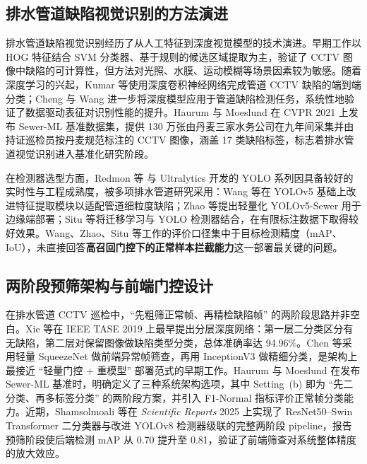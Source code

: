 \documentclass[UTF8,openany,12pt]{ctexbook}
\begin{document}
\subsection{排水管道缺陷视觉识别的方法演进}
排水管道缺陷视觉识别经历了从人工特征到深度视觉模型的技术演进。早期工作以 HOG 特征结合 SVM 分类器、基于规则的候选区域提取为主，验证了 CCTV 图像中缺陷的可计算性，但方法对光照、水膜、运动模糊等场景因素较为敏感\cite{halfawy2014hogsvm}。随着深度学习的兴起，Kumar 等使用深度卷积神经网络完成管道 CCTV 缺陷的端到端分类\cite{kumar2018cnn}；Cheng 与 Wang 进一步将深度模型应用于管道缺陷检测任务，系统性地验证了数据驱动表征对识别性能的提升\cite{cheng2018deep}。Haurum 与 Moeslund 在 CVPR 2021 上发布 Sewer-ML 基准数据集，提供 130 万张由丹麦三家水务公司在九年间采集并由持证巡检员按丹麦规范标注的 CCTV 图像，涵盖 17 类缺陷标签，标志着排水管道视觉识别进入基准化研究阶段\cite{haurum2021sewerml}。

在检测器选型方面，Redmon 等\cite{redmon2016yolo} 与 Ultralytics\cite{jocher2023ultralytics} 开发的 YOLO 系列因具备较好的实时性与工程成熟度，被多项排水管道研究采用：Wang 等在 YOLOv5 基础上改进特征提取模块以适配管道细粒度缺陷\cite{wang2023improvedyolov5}；Zhao 等提出轻量化 YOLOv5-Sewer 用于边缘端部署\cite{zhao2024yolov5sewer}；Situ 等将迁移学习与 YOLO 检测器结合，在有限标注数据下取得较好效果\cite{situ2023transfer}。Wang、Zhao、Situ 等工作的评价口径集中于目标检测精度（mAP、IoU），未直接回答\textbf{高召回门控下的正常样本拦截能力}这一部署最关键的问题。

\subsection{两阶段预筛架构与前端门控设计}
在排水管道 CCTV 巡检中，``先粗筛正常帧、再精检缺陷帧'' 的两阶段思路并非空白。Xie 等在 IEEE TASE 2019 上最早提出分层深度网络：第一层二分类区分有无缺陷，第二层对保留图像做缺陷类型分类，总体准确率达 94.96\%\cite{xie2019hierarchical}。Chen 等采用轻量 SqueezeNet 做前端异常帧筛查，再用 InceptionV3 做精细分类，是架构上最接近 ``轻量门控 + 重模型'' 部署范式的早期工作\cite{chen2018intelligent}。Haurum 与 Moeslund 在发布 Sewer-ML 基准时，明确定义了三种系统架构选项，其中 Setting~(b) 即为 ``先二分类、再多标签分类'' 的两阶段方案，并引入 F1-Normal 指标评价正常帧分类能力\cite{haurum2021sewerml}。近期，Shamsolmoali 等在 \emph{Scientific Reports} 2025 上实现了 ResNet50--Swin Transformer 二分类器与改进 YOLOv8 检测器级联的完整两阶段 pipeline，报告预筛阶段使后端检测 mAP 从 0.70 提升至 0.81，验证了前端筛查对系统整体精度的放大效应\cite{shamsolmoali2025twostage}。
\end{document}
